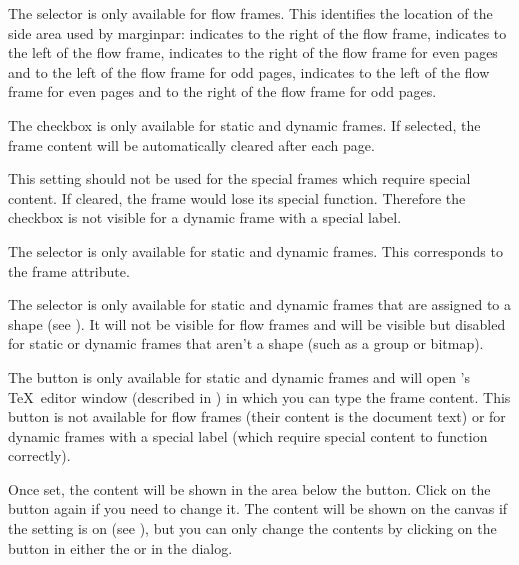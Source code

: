 The  selector is only available for flow frames.
This identifies the location of the side area used by
\gls{marginpar}:  indicates to the
right of the flow frame,  indicates to the
left of the flow frame,  indicates to the
right of the flow frame for even pages and to the left of the flow
frame for odd pages,  indicates to
the left of the flow frame for even pages and to the right of the
flow frame for odd pages. 


The  checkbox is only available for static and dynamic frames.
If selected, the frame content will be automatically cleared after
each page.

\begin{information}
This setting should not be used for the special frames
which require special content. If cleared, the frame would lose its
special function. Therefore the 
checkbox is not visible for a dynamic frame with a special label.
\end{information}

The  selector is only available for static and dynamic frames.
This corresponds to the  frame attribute.

The  selector is only available for static and dynamic frames
that are assigned to a \gls{shape} (see ). 
It will not be visible for flow frames and will be visible but disabled for
static or dynamic frames that aren't a \gls{shape} (such as a
\gls{group} or \gls{bitmap}).

The  button is only available for
static and dynamic frames and will open \FlowframTk's \TeX\ editor
window (described in ) in which you can
type the frame content. This button is not available for flow frames
(their content is the document text) or for dynamic frames with a
special label (which require special content to function correctly).

Once set, the content will be shown in the area below the 
 button. Click on the button again if
you need to change it.
The content will be shown on the \gls{canvas} if the
 setting is on
(see ), but you can only change
the contents by clicking on the 
button in either the  or in the
 dialog.

